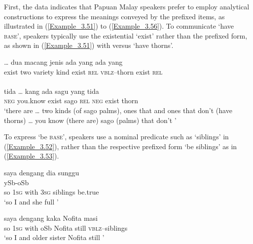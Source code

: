 First, the data indicates that Papuan Malay speakers prefer to employ analytical constructions to express the meanings conveyed by the prefixed items, as illustrated in (\ref{Example_3.51}) to (\ref{Example_3.56}). To communicate ‘have \textsc{base}’, speakers typically use the existential   ‘exist’ rather than the prefixed form, as shown in (\ref{Example_3.51}) with  versus  ‘have thorns’.

\ea
\label{Example_3.51}
 {{\ldots}} {dua} {{macang}} {{jenis}} {{ada}} {{yang}} {{}} {ada} {yang}\\ %
 {exist}  {}  two  {variety}  {kind}  {exist}  {\textsc{rel}}  {\textsc{vblz}–thorn}  exist  \textsc{rel}\\
\\
\gll tida  {\ldots}  {kang}  {ada}  {sagu}  {yang}  {tida}    {}\\
 \textsc{neg}  {}  {you.know}  {exist}  {sago}  {\textsc{rel}}  {\textsc{neg}}  exist  {thorn}\\

\glt 
‘there are {\ldots} two kinds (of sago palms), ones that  and ones that don’t (have thorns) {\ldots} you know (there are) sago (palms) that don’t ’ \textstyleExampleSource{[081014-006-CvPr.0007/0009]}
\z


To express ‘be \textsc{base}’, speakers use a nominal predicate such as  ‘siblings’ in (\ref{Example_3.52}), rather than the respective prefixed form  ‘be siblings’ as in (\ref{Example_3.53}).

\ea
\label{Example_3.52}
 {saya} {dengang} {dia}  {sunggu}\\ %
 {} {} {} {} {ySb-oSb}\\
 so  \textsc{1sg}  with  \textsc{3sg}  siblings  be.true\\
\glt 
‘so I and she  full ’ \textstyleExampleSource{[080927-009-CvNP.0044]}
\z

\ea
\label{Example_3.53}
 {saya} {dengang} {kaka} {Nofita} {masi} {}\\ %
 so  \textsc{1sg}  with  oSb  Nofita  still  \textsc{vblz}–siblings\\
\glt 
‘so I and older sister Nofita  still ’ \textstyleExampleSource{[080927-007-CvNP.0022]}
\z


